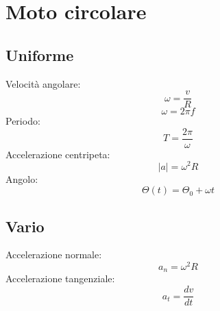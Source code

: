 \documentclass[a4paper,10pt]{book}
\begin{document}
\section{Moto circolare}
\subsection{Uniforme}
Velocità angolare: \[\omega=\frac{v}{R}\]
\[\omega=2\pi f\]
Periodo: \[T=\frac{2\pi}{\omega}\]
Accelerazione centripeta: \[|a|=\omega^2R\]
Angolo: \[\varTheta(t)=\varTheta_0+\omega t\]
\subsection{Vario}
Accelerazione normale: \[a_n=\omega^2R\]
Accelerazione tangenziale: \[a_t=\frac{dv}{dt}\]
\end{document}
